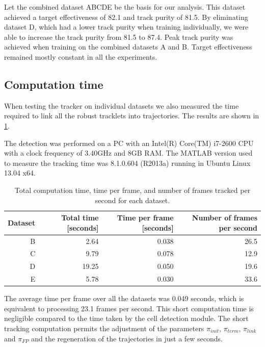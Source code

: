		Let the combined dataset ABCDE be the basis for our analysis. This dataset achieved a target effectiveness of 82.1 and track purity of 81.5. By eliminating dataset D, which had a lower track purity when training individually, we were able to increase the track purity from 81.5 to 87.4. Peak track purity was achieved when training on the combined datasets A and B. Target effectiveness remained mostly constant in all the experiments.
		
	\subsection{Computation time}
	
	When testing the tracker on individual datasets we also measured the time required to link all the robust tracklets into trajectories. The results are shown in \cref{tab:results_tracker_speed}. 
	
	The detection was performed on a PC with an Intel(R) Core(TM) i7-2600 CPU with a clock frequency of 3.40GHz and 8GB RAM. The MATLAB version used to measure the tracking time was 8.1.0.604 (R2013a) running in Ubuntu Linux 13.04 x64.
	
	\begin{table}[h]
		\centering
		\begin{tabular}{rrrr}
			Dataset & Total time [seconds] & Time per frame [seconds] & Number of frames per second \\
		\hline
			      B &                 2.64 &                   0.038 &                     26.5 \\
			      C &                 9.79 &                   0.078 &                     12.9 \\
			      D &                19.25 &                   0.050 &                     19.6 \\
			      E &                 5.78 &                   0.030 &                     33.6
		\end{tabular} 
		\caption{Total computation time, time per frame, and number of frames tracked per second for each dataset.}
		\label{tab:results_tracker_speed}
	\end{table}
	
	The average time per frame over all the datasets was 0.049 seconds, which is equivalent to processing 23.1 frames per second. This short computation time is negligible compared to the time taken by the cell detection module. The short tracking computation permits the adjustment of the parameters $\pi_{init}$, $\pi_{term}$, $\pi_{link}$ and $\pi_{FP}$ and the regeneration of the trajectories in just a few seconds.
	
